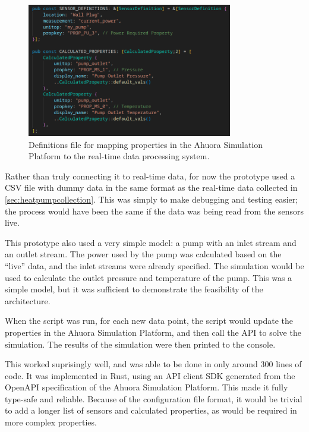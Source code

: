 \documentclass[12pt]{report}
\begin{document}
\begin{figure}
    \centering
    \includegraphics[width=0.8\textwidth]{live_constants.png}
    \caption{Definitions file for mapping properties in the Ahuora Simulation Platform to the real-time data processing system.}
    \label{fig:live-constants}
\end{figure}

Rather than truly connecting it to real-time data, for now the prototype used a CSV file with dummy data in the same format as the real-time data collected in \cref{sec:heatpumpcollection}. This was simply to make debugging and testing easier; the process would have been the same if the data was being read from the sensors live.

This prototype also used a very simple model: a pump with an inlet stream and an outlet stream. The power used by the pump was calculated based on the  ``live'' data, and the inlet streams were already specified. The simulation would be used to calculate the outlet pressure and temperature of the pump. This was a simple model, but it was sufficient to demonstrate the feasibility of the architecture.


When the script was run, for each new data point, the script would update the properties in the Ahuora Simulation Platform, and then call the API to solve the simulation. The results of the simulation were then printed to the console. 

This worked suprisingly well, and was able to be done in only around 300 lines of code. It was implemented in Rust, using an API client SDK generated from the OpenAPI specification of the Ahuora Simulation Platform. This made it fully type-safe and reliable. Because of the configuration file format, it would be trivial to add a longer list of sensors and calculated properties, as would be required in more complex properties.
\end{document}
